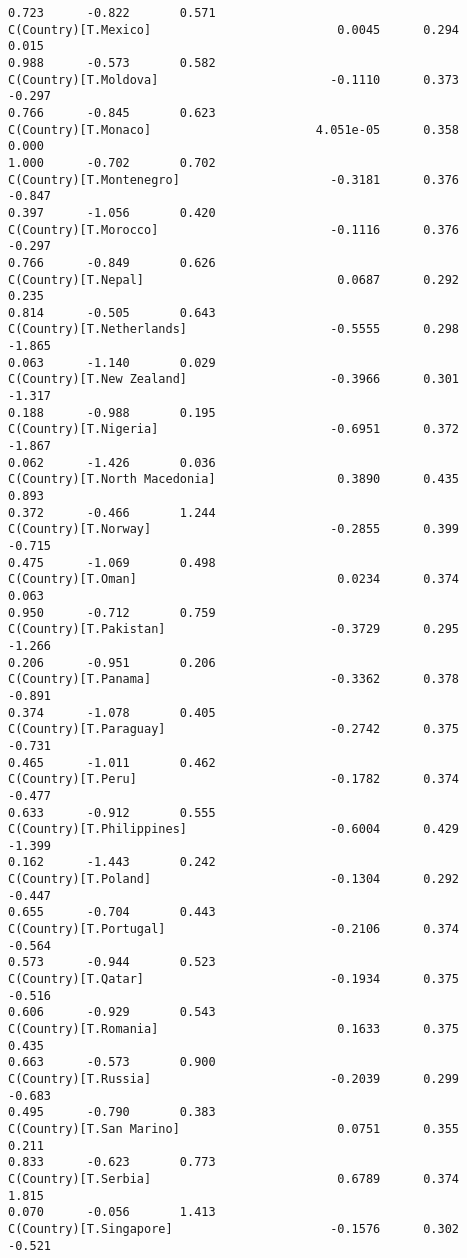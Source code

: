 \documentclass[11pt]{article}
\begin{document}
\begin{Verbatim}[commandchars=\\\{\}]
0.723      -0.822       0.571
C(Country)[T.Mexico]                          0.0045      0.294      0.015
0.988      -0.573       0.582
C(Country)[T.Moldova]                        -0.1110      0.373     -0.297
0.766      -0.845       0.623
C(Country)[T.Monaco]                       4.051e-05      0.358      0.000
1.000      -0.702       0.702
C(Country)[T.Montenegro]                     -0.3181      0.376     -0.847
0.397      -1.056       0.420
C(Country)[T.Morocco]                        -0.1116      0.376     -0.297
0.766      -0.849       0.626
C(Country)[T.Nepal]                           0.0687      0.292      0.235
0.814      -0.505       0.643
C(Country)[T.Netherlands]                    -0.5555      0.298     -1.865
0.063      -1.140       0.029
C(Country)[T.New Zealand]                    -0.3966      0.301     -1.317
0.188      -0.988       0.195
C(Country)[T.Nigeria]                        -0.6951      0.372     -1.867
0.062      -1.426       0.036
C(Country)[T.North Macedonia]                 0.3890      0.435      0.893
0.372      -0.466       1.244
C(Country)[T.Norway]                         -0.2855      0.399     -0.715
0.475      -1.069       0.498
C(Country)[T.Oman]                            0.0234      0.374      0.063
0.950      -0.712       0.759
C(Country)[T.Pakistan]                       -0.3729      0.295     -1.266
0.206      -0.951       0.206
C(Country)[T.Panama]                         -0.3362      0.378     -0.891
0.374      -1.078       0.405
C(Country)[T.Paraguay]                       -0.2742      0.375     -0.731
0.465      -1.011       0.462
C(Country)[T.Peru]                           -0.1782      0.374     -0.477
0.633      -0.912       0.555
C(Country)[T.Philippines]                    -0.6004      0.429     -1.399
0.162      -1.443       0.242
C(Country)[T.Poland]                         -0.1304      0.292     -0.447
0.655      -0.704       0.443
C(Country)[T.Portugal]                       -0.2106      0.374     -0.564
0.573      -0.944       0.523
C(Country)[T.Qatar]                          -0.1934      0.375     -0.516
0.606      -0.929       0.543
C(Country)[T.Romania]                         0.1633      0.375      0.435
0.663      -0.573       0.900
C(Country)[T.Russia]                         -0.2039      0.299     -0.683
0.495      -0.790       0.383
C(Country)[T.San Marino]                      0.0751      0.355      0.211
0.833      -0.623       0.773
C(Country)[T.Serbia]                          0.6789      0.374      1.815
0.070      -0.056       1.413
C(Country)[T.Singapore]                      -0.1576      0.302     -0.521

\end{Verbatim}
\end{document}
